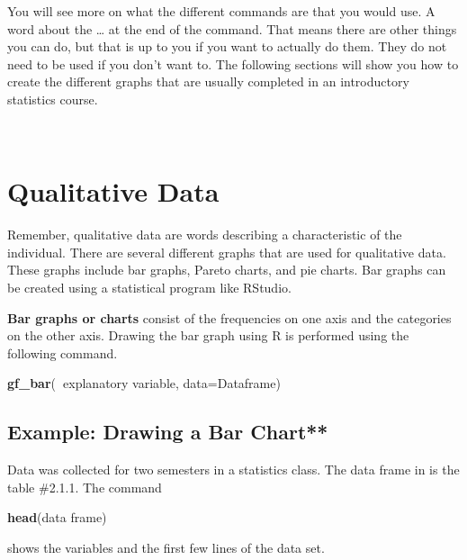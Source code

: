 \documentclass[
]{book}
\newenvironment{Shaded}{\begin{snugshade}}{\end{snugshade}}
\newcommand{\DataTypeTok}[1]{\textcolor[rgb]{0.13,0.29,0.53}{#1}}
\newcommand{\KeywordTok}[1]{\textcolor[rgb]{0.13,0.29,0.53}{\textbf{#1}}}
\newcommand{\NormalTok}[1]{#1}
\newcommand{\OperatorTok}[1]{\textcolor[rgb]{0.81,0.36,0.00}{\textbf{#1}}}
\begin{document}
You will see more on what the different commands are that you would use. A word about the \ldots{} at the end of the command. That means there are other things you can do, but that is up to you if you want to actually do them. They do not need to be used if you don't want to. The following sections will show you how to create the different graphs that are usually completed in an introductory statistics course.

\emph{\\
}

\hypertarget{qualitative-data}{%
\section{Qualitative Data}\label{qualitative-data}}

Remember, qualitative data are words describing a characteristic of the individual. There are several different graphs that are used for qualitative data. These graphs include bar graphs, Pareto charts, and pie charts. Bar graphs can be created using a statistical program like RStudio.

\textbf{Bar graphs or charts} consist of the frequencies on one axis and the categories on the other axis. Drawing the bar graph using R is performed using the following command.

\begin{Shaded}
\begin{Highlighting}[]
\KeywordTok{gf_bar}\NormalTok{(}\OperatorTok{~}\NormalTok{explanatory variable, }\DataTypeTok{data=}\NormalTok{Dataframe)}
\end{Highlighting}
\end{Shaded}

\hypertarget{example-drawing-a-bar-chart}{%
\subsection{Example: Drawing a Bar Chart**}\label{example-drawing-a-bar-chart}}

Data was collected for two semesters in a statistics class. The data frame in is the table \#2.1.1. The command

\begin{Shaded}
\begin{Highlighting}[]
\KeywordTok{head}\NormalTok{(data frame) }
\end{Highlighting}
\end{Shaded}

shows the variables and the first few lines of the data set.
\end{document}
